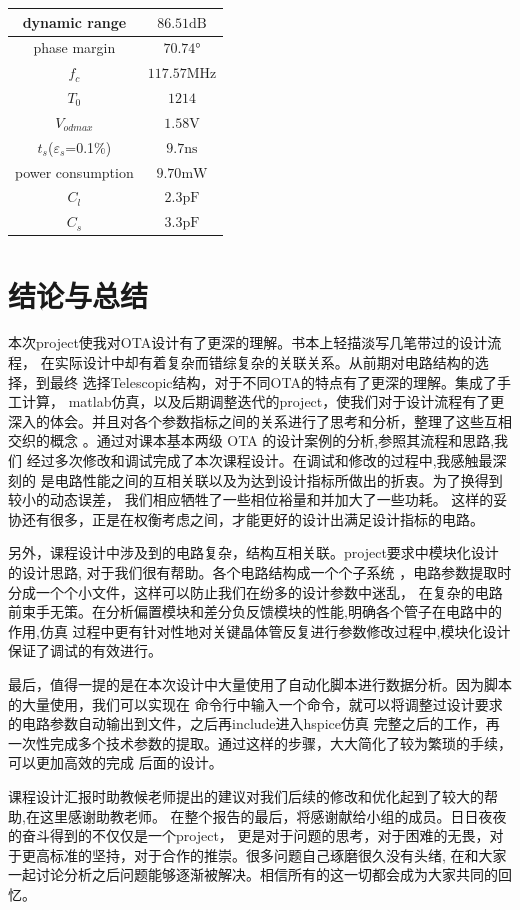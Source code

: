 \documentclass[a4paper]{article}
\newcommand{\uV}{\si{\volt}}
\newcommand{\upF}{\si{\pico\farad}}
\newcommand{\uns}{\si{\nano\second}}
\newcommand{\umW}{\si{\milli\watt}}
\newcommand{\uMHz}{\si{\mega\hertz}}
\newcommand{\udB}{\si{\deci\bel}}
\newcommand{\udeg}{\si{\degree}}
\begin{document}
\begin{table}[htbp]
    \begin{tabular}{|c|c|}
        \hline
        dynamic range&$86.51\udB$
        \\\hline
        phase margin&$70.74\udeg$
        \\\hline
        $f_c$ &$117.57\uMHz$
        \\\hline 
        $T_0$&$1214$
        \\\hline
        $V_{odmax}$&$1.58\uV$
        \\\hline
        $t_s$($\varepsilon_s$=0.1\%)&$9.7\uns$
        \\\hline
        power consumption&$9.70\umW$
        \\\hline
        $C_l$&$2.3\upF$
        \\\hline
        $C_s$&$3.3\upF$
        \\\hline
    \end{tabular}
\end{table}


\section{结论与总结}
本次project使我对OTA设计有了更深的理解。书本上轻描淡写几笔带过的设计流程，
在实际设计中却有着复杂而错综复杂的关联关系。从前期对电路结构的选择，到最终
选择Telescopic结构，对于不同OTA的特点有了更深的理解。集成了手工计算，
matlab仿真，以及后期调整迭代的project，使我们对于设计流程有了更
深入的体会。并且对各个参数指标之间的关系进行了思考和分析，整理了这些互相交织的概念
。通过对课本基本两级 OTA 的设计案例的分析,参照其流程和思路,我们
经过多次修改和调试完成了本次课程设计。在调试和修改的过程中,我感触最深刻的
是电路性能之间的互相关联以及为达到设计指标所做出的折衷。为了换得到较小的动态误差，
我们相应牺牲了一些相位裕量和并加大了一些功耗。
这样的妥协还有很多，正是在权衡考虑之间，才能更好的设计出满足设计指标的电路。

另外，课程设计中涉及到的电路复杂，结构互相关联。project要求中模块化设计的设计思路,
对于我们很有帮助。各个电路结构成一个个子系统
，电路参数提取时分成一个个小文件，这样可以防止我们在纷多的设计参数中迷乱，
在复杂的电路前束手无策。在分析偏置模块和差分负反馈模块的性能,明确各个管子在电路中的作用,仿真
过程中更有针对性地对关键晶体管反复进行参数修改过程中,模块化设计保证了调试的有效进行。

最后，值得一提的是在本次设计中大量使用了自动化脚本进行数据分析。因为脚本的大量使用，我们可以实现在
命令行中输入一个命令，就可以将调整过设计要求的电路参数自动输出到文件，之后再include进入hspice仿真
完整之后的工作，再一次性完成多个技术参数的提取。通过这样的步骤，大大简化了较为繁琐的手续，可以更加高效的完成
后面的设计。

课程设计汇报时助教候老师提出的建议对我们后续的修改和优化起到了较大的帮助,在这里感谢助教老师。
在整个报告的最后，将感谢献给小组的成员。日日夜夜的奋斗得到的不仅仅是一个project，
更是对于问题的思考，对于困难的无畏，对于更高标准的坚持，对于合作的推崇。很多问题自己琢磨很久没有头绪,
在和大家一起讨论分析之后问题能够逐渐被解决。相信所有的这一切都会成为大家共同的回忆。
\end{document}
